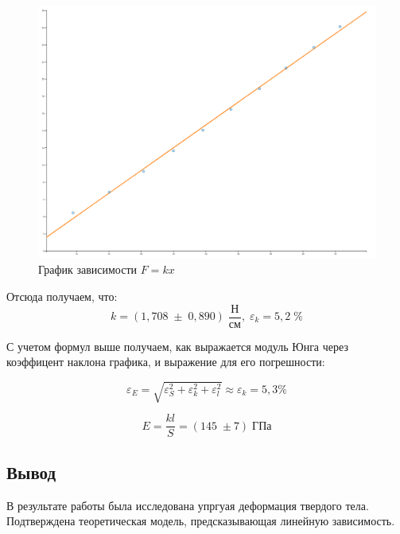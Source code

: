 \documentclass[a4paper, 12pt]{article}
\begin{document}
\begin{figure}[H]
        \centering
        \includegraphics[scale = 0.3]{graph1.png}
        \caption{График зависимости $F = kx$}
\end{figure}

\begin{center}
    Отсюда получаем, что:
    \begin{equation}
        k = (1,708 \; \pm \; 0,890) \; \frac{\text{Н}}{\text{см}}, \; \varepsilon_{k} = 5,2 \; \% 
    \end{equation}

    \bigskip

    С учетом формул выше получаем, как выражается модуль Юнга через коэффицент наклона графика,
и выражение для его погрешности:

\begin{equation}
    \varepsilon_{E}=\sqrt{\varepsilon^2_{S}+\varepsilon^2_{k}+\varepsilon^2_{l}} \approx \varepsilon_{k} = 5,3 \%
\end{equation}

\begin{equation}
        E = \frac{kl}{S} = (145 \; \pm 7)\; \text{ГПа}
\end{equation}
\end{center}

\begin{center}

\section*{Вывод}
    
В результате работы была исследована упргуая деформация
    твердого тела. Подтверждена теоретическая модель, предсказывающая
    линейную зависимость.
\end{center}
\end{document}
